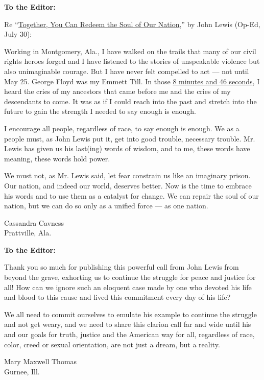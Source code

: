 \textbf{To the Editor:}

Re
``\href{https://www.nytimes3xbfgragh.onion/2020/07/30/opinion/john-lewis-civil-rights-america.html}{Together,
You Can Redeem the Soul of Our Nation},'' by John Lewis (Op-Ed, July
30):

Working in Montgomery, Ala., I have walked on the trails that many of
our civil rights heroes forged and I have listened to the stories of
unspeakable violence but also unimaginable courage. But I have never
felt compelled to act --- not until May 25. George Floyd was my Emmett
Till. In those
\href{https://www.nytimes3xbfgragh.onion/2020/06/18/us/george-floyd-timing.html}{8
minutes and 46 seconds}, I heard the cries of my ancestors that came
before me and the cries of my descendants to come. It was as if I could
reach into the past and stretch into the future to gain the strength I
needed to say enough is enough.

I encourage all people, regardless of race, to say enough is enough. We
as a people must, as John Lewis put it, get into good trouble, necessary
trouble. Mr. Lewis has given us his last(ing) words of wisdom, and to
me, these words have meaning, these words hold power.

We must not, as Mr. Lewis said, let fear constrain us like an imaginary
prison. Our nation, and indeed our world, deserves better. Now is the
time to embrace his words and to use them as a catalyst for change. We
can repair the soul of our nation, but we can do so only as a unified
force --- as one nation.

Cassandra Cavness\\
Prattville, Ala.

\textbf{To the Editor:}

Thank you so much for publishing this powerful call from John Lewis from
beyond the grave, exhorting us to continue the struggle for peace and
justice for all! How can we ignore such an eloquent case made by one who
devoted his life and blood to this cause and lived this commitment every
day of his life?

We all need to commit ourselves to emulate his example to continue the
struggle and not get weary, and we need to share this clarion call far
and wide until his and our goals for truth, justice and the American way
for all, regardless of race, color, creed or sexual orientation, are not
just a dream, but a reality.

Mary Maxwell Thomas\\
Gurnee, Ill.

